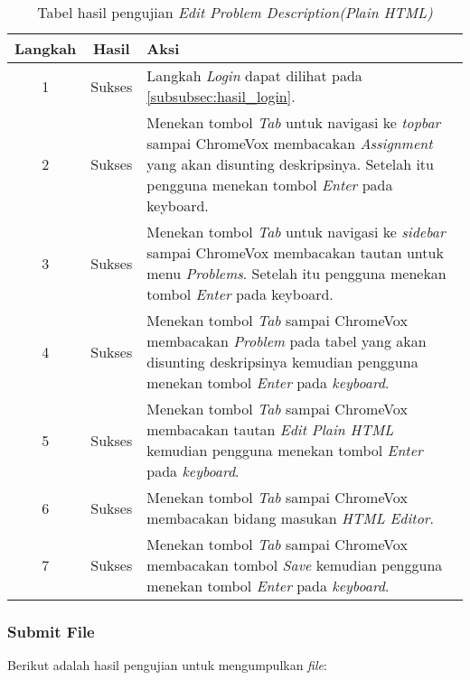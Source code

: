 \begin{table}[H]
	\centering
	\caption{Tabel hasil pengujian \textit{Edit Problem Description(Plain HTML)}}
	\label{tab:hasil_edit_problem_description_plain_html}
	\begin{tabular}{|c|c|p{12cm}|}
		\toprule
		Langkah & Hasil & Aksi\\
		\midrule
		1 & Sukses & Langkah \textit{Login} dapat dilihat pada \ref{subsubsec:hasil_login}.\\
		2 & Sukses & Menekan tombol \textit{Tab} untuk navigasi ke \textit{topbar} sampai ChromeVox membacakan \textit{Assignment} yang akan disunting deskripsinya. Setelah itu pengguna menekan tombol \textit{Enter} pada keyboard.\\
		3 & Sukses & Menekan tombol \textit{Tab} untuk navigasi ke \textit{sidebar} sampai ChromeVox membacakan tautan untuk menu \textit{Problems}. Setelah itu pengguna menekan tombol \textit{Enter} pada keyboard.\\
		4 & Sukses & Menekan tombol \textit{Tab} sampai ChromeVox membacakan \textit{Problem} pada tabel yang akan disunting deskripsinya kemudian pengguna menekan tombol \textit{Enter} pada \textit{keyboard}.\\
		5 & Sukses & Menekan tombol \textit{Tab} sampai ChromeVox membacakan tautan \textit{Edit Plain HTML} kemudian pengguna menekan tombol \textit{Enter} pada \textit{keyboard}.\\
		6 & Sukses & Menekan tombol \textit{Tab} sampai ChromeVox membacakan bidang masukan \textit{HTML Editor}.\\
		7 & Sukses & Menekan tombol \textit{Tab} sampai ChromeVox membacakan tombol \textit{Save} kemudian pengguna menekan tombol \textit{Enter} pada \textit{keyboard}.\\
		\bottomrule
	\end{tabular}
\end{table}

\subsubsection{Submit File}
\label{subsubsec:hasil_submit}
Berikut adalah hasil pengujian untuk mengumpulkan \textit{file}:

